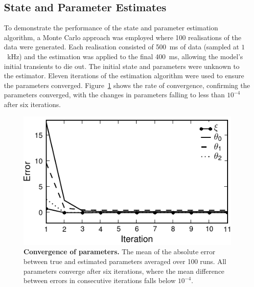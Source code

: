 \documentclass[10pt]{article}
\begin{document}
\subsection*{State and Parameter Estimates} 
\label{sec:state_and_param_results}
To demonstrate the performance of the state and parameter estimation algorithm, a Monte Carlo approach was employed where 100 realisations of the data were generated. Each realisation consisted of 500~ms of data (sampled at $1$~kHz) and the estimation was applied to the final 400~ms, allowing the model's initial transients to die out. The initial state and parameters were unknown to the estimator. Eleven iterations of the estimation algorithm were used to ensure the parameters  converged. Figure~\ref{fig:ParametersConvergence} shows the rate of convergence, confirming the parameters converged, with the changes in parameters falling to less than $10^{-4}$ after six iterations.
\begin{figure}
        \centering
\includegraphics{./Graph/convergence.pdf}
\caption{{\bf Convergence of parameters.} The mean of the absolute error between true and estimated parameters averaged over 100 runs. All parameters converge after six iterations, where the mean difference between errors in consecutive iterations falls below $10^{-4}$.}
\label{fig:ParametersConvergence}
\end{figure}
\end{document}
